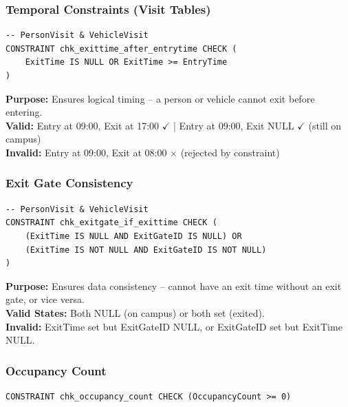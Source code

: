 \documentclass[a4paper, 12pt]{article}
\begin{document}
\subsubsection{Temporal Constraints (Visit Tables)}

\begin{lstlisting}[style=sqlstyle, caption={Exit Time Validation}, label={lst:chk-time}]
-- PersonVisit & VehicleVisit
CONSTRAINT chk_exittime_after_entrytime CHECK (
    ExitTime IS NULL OR ExitTime >= EntryTime
)
\end{lstlisting}

\textbf{Purpose:} Ensures logical timing -- a person or vehicle cannot exit before entering.\\
\textbf{Valid:} Entry at 09:00, Exit at 17:00 $\checkmark$ \quad | \quad Entry at 09:00, Exit NULL $\checkmark$ (still on campus)\\
\textbf{Invalid:} Entry at 09:00, Exit at 08:00 $\times$ (rejected by constraint)

\subsubsection{Exit Gate Consistency}

\begin{lstlisting}[style=sqlstyle, caption={Exit Gate/Time Consistency}, label={lst:chk-exit}]
-- PersonVisit & VehicleVisit
CONSTRAINT chk_exitgate_if_exittime CHECK (
    (ExitTime IS NULL AND ExitGateID IS NULL) OR
    (ExitTime IS NOT NULL AND ExitGateID IS NOT NULL)
)
\end{lstlisting}

\textbf{Purpose:} Ensures data consistency -- cannot have an exit time without an exit gate, or vice versa.\\
\textbf{Valid States:} Both NULL (on campus) or both set (exited).\\
\textbf{Invalid:} ExitTime set but ExitGateID NULL, or ExitGateID set but ExitTime NULL.

\subsubsection{Occupancy Count}

\begin{lstlisting}[style=sqlstyle, caption={Occupancy Count Validation}, label={lst:chk-occ}]
CONSTRAINT chk_occupancy_count CHECK (OccupancyCount >= 0)
\end{lstlisting}
\end{document}

